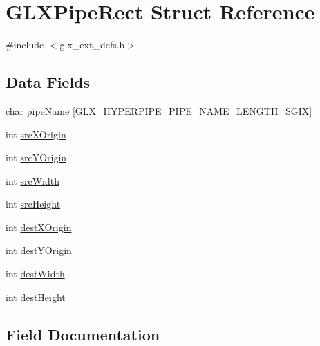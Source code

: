 \hypertarget{struct_g_l_x_pipe_rect}{}\section{G\+L\+X\+Pipe\+Rect Struct Reference}
\label{struct_g_l_x_pipe_rect}


{\ttfamily \#include $<$glx\+\_\+ext\+\_\+defs.\+h$>$}

\subsection*{Data Fields}
\begin{DoxyCompactItemize}
\item 
char \hyperlink{struct_g_l_x_pipe_rect_aa4c4f60e9647705ddefa10f95a37cb79}{pipe\+Name} \mbox{[}\hyperlink{glx__ext__defs_8h_ae1c8261c0861010d8003a31d07e26005}{G\+L\+X\+\_\+\+H\+Y\+P\+E\+R\+P\+I\+P\+E\+\_\+\+P\+I\+P\+E\+\_\+\+N\+A\+M\+E\+\_\+\+L\+E\+N\+G\+T\+H\+\_\+\+S\+G\+IX}\mbox{]}
\item 
int \hyperlink{struct_g_l_x_pipe_rect_a9df2313c01f75d149e64f2ff467bc266}{src\+X\+Origin}
\item 
int \hyperlink{struct_g_l_x_pipe_rect_a1f7316dff7050ab2ce9d3d37f8c5450e}{src\+Y\+Origin}
\item 
int \hyperlink{struct_g_l_x_pipe_rect_a2c6c180a4dabb71076366e06a1c7d0ef}{src\+Width}
\item 
int \hyperlink{struct_g_l_x_pipe_rect_a35632524bce6bffa05f284a9b1c1b8ff}{src\+Height}
\item 
int \hyperlink{struct_g_l_x_pipe_rect_a8b7b941894ad3420326d7e9fa885bb71}{dest\+X\+Origin}
\item 
int \hyperlink{struct_g_l_x_pipe_rect_aef7766b02ef07c20a11e89da5878b469}{dest\+Y\+Origin}
\item 
int \hyperlink{struct_g_l_x_pipe_rect_a3c07991d2a8fb6e973eae834650b3dad}{dest\+Width}
\item 
int \hyperlink{struct_g_l_x_pipe_rect_a858b0ea6642e451495aff35cfefbd083}{dest\+Height}
\end{DoxyCompactItemize}


\subsection{Field Documentation}
\mbox{\label{struct_g_l_x_pipe_rect_a858b0ea6642e451495aff35cfefbd083}} 
